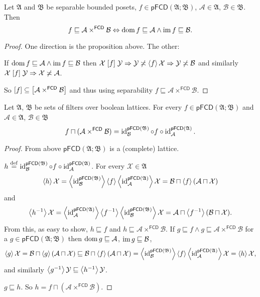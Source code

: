 \begin{thm}
Let $\mathfrak{A}$ and $\mathfrak{B}$ be separable bounded posets,
$f\in\mathsf{pFCD}(\mathfrak{A};\mathfrak{B})$, $\mathcal{A}\in\mathfrak{A}$,
$\mathcal{B}\in\mathfrak{B}$. Then
\[
f\sqsubseteq\mathcal{A}\times^{\mathsf{FCD}}\mathcal{B}\Leftrightarrow\operatorname{dom} f\sqsubseteq\mathcal{A}\wedge\operatorname{im} f\sqsubseteq\mathcal{B}.
\]
\end{thm}
\begin{proof}
One direction is the proposition above. The other:

If $\operatorname{dom} f\sqsubseteq\mathcal{A}\wedge\operatorname{im} f\sqsubseteq\mathcal{B}$
then $\mathcal{X}\mathrel{\left[f\right]}\mathcal{Y}\Rightarrow\mathcal{Y}\not\asymp\left\langle f\right\rangle\mathcal{X}\Rightarrow\mathcal{Y}\not\asymp\mathcal{B}$
and similarly $\mathcal{X}\mathrel{\left[f\right]}\mathcal{Y}\Rightarrow\mathcal{X}\not\asymp\mathcal{A}$.

So $\mathord{\mathrel{\left[f\right]}}\subseteq\mathord{\mathrel{\left[\mathcal{A}\times^{\mathsf{FCD}}\mathcal{B}\right]}}$
and thus using separability $f\sqsubseteq\mathcal{A}\times^{\mathsf{FCD}}\mathcal{B}$.\end{proof}
\begin{thm}
Let $\mathfrak{A}$, $\mathfrak{B}$ be sets of filters over boolean
lattices. For every $f\in\mathsf{pFCD}(\mathfrak{A};\mathfrak{B})$
and $\mathcal{A}\in\mathfrak{A}$, $\mathcal{B}\in\mathfrak{B}$ 
\[
f\sqcap(\mathcal{A}\times^{\mathsf{FCD}}\mathcal{B})=\operatorname{id}_{\mathcal{B}}^{\mathsf{pFCD}(\mathfrak{B})}\circ f\circ\operatorname{id}_{\mathcal{A}}^{\mathsf{pFCD}(\mathfrak{A})}.
\]
\end{thm}
\begin{proof}
From above $\mathsf{pFCD}(\mathfrak{A};\mathfrak{B})$ is a (complete)
lattice.

$h\overset{\mathrm{def}}{=}\operatorname{id}_{\mathcal{B}}^{\mathsf{pFCD}(\mathfrak{B})}\circ f\circ\operatorname{id}_{\mathcal{A}}^{\mathsf{pFCD}(\mathfrak{A})}$.
For every $\mathcal{X}\in\mathfrak{A}$
\[
\left\langle h\right\rangle\mathcal{X}=\left\langle \operatorname{id}_{\mathcal{B}}^{\mathsf{pFCD}(\mathfrak{B})}\right\rangle\left\langle f\right\rangle\left\langle \operatorname{id}_{\mathcal{A}}^{\mathsf{pFCD}(\mathfrak{A})}\right\rangle\mathcal{X}=\mathcal{B}\sqcap\left\langle f\right\rangle(\mathcal{A}\sqcap\mathcal{X})
\]
and
\[
\left\langle h^{-1}\right\rangle\mathcal{X}=\left\langle \operatorname{id}_{\mathcal{A}}^{\mathsf{pFCD}(\mathfrak{A})}\right\rangle\left\langle f^{-1}\right\rangle\left\langle \operatorname{id}_{\mathcal{B}}^{\mathsf{pFCD}(\mathfrak{B})}\right\rangle\mathcal{X}=\mathcal{A}\sqcap\left\langle f^{-1}\right\rangle(\mathcal{B}\sqcap\mathcal{X}).
\]
From this, as easy to show, $h\sqsubseteq f$ and $h\sqsubseteq\mathcal{A}\times^{\mathsf{FCD}}\mathcal{B}$.
If $g\sqsubseteq f\wedge g\sqsubseteq\mathcal{A}\times^{\mathsf{FCD}}\mathcal{B}$
for a $g\in\mathsf{pFCD}(\mathfrak{A};\mathfrak{B})$ then $\operatorname{dom} g\sqsubseteq\mathcal{A}$,
$\operatorname{im} g\sqsubseteq\mathcal{B}$,
\[
\left\langle g\right\rangle\mathcal{X}=\mathcal{B}\sqcap\left\langle g\right\rangle(\mathcal{A}\sqcap\mathcal{X})\sqsubseteq\mathcal{B}\sqcap\left\langle f\right\rangle(\mathcal{A}\sqcap\mathcal{X})=\left\langle \operatorname{id}_{\mathcal{B}}^{\mathsf{pFCD}(\mathfrak{B})}\right\rangle\left\langle f\right\rangle\left\langle \operatorname{id}_{\mathcal{A}}^{\mathsf{pFCD}(\mathfrak{A})}\right\rangle\mathcal{X}=\left\langle h\right\rangle\mathcal{X},
\]
and similarly $\left\langle g^{-1}\right\rangle\mathcal{Y}\sqsubseteq\left\langle h^{-1}\right\rangle\mathcal{Y}$.

$g\sqsubseteq h$. So $h=f\sqcap(\mathcal{A}\times^{\mathsf{FCD}}\mathcal{B})$.\end{proof}

